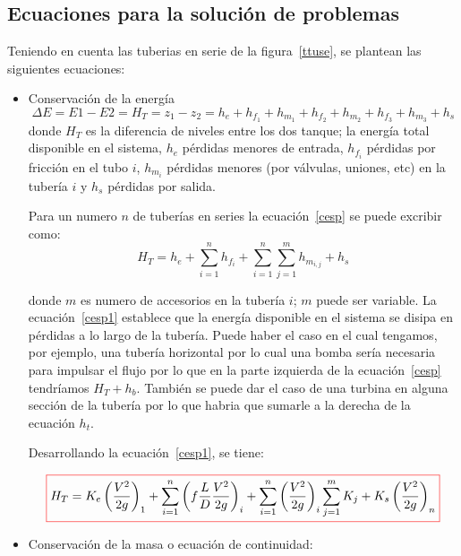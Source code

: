 \documentclass[10pt, oneside]{article}
\begin{document}
\subsection{Ecuaciones para la soluci\'on de problemas}
Teniendo en cuenta las tuberias en serie de la figura~\ref{ttuse}, se plantean las siguientes ecuaciones:
\begin{itemize}
\item Conservaci\'on de la energ\'ia
\begin{equation}
\Delta E = E1-E2 = H_T = z_1 - z_2 = h_e + h_{f_1} + h_{m_1} + h_{f_2} + h_{m_2} + h_{f_3} + h_{m_3} + h_s
\label{cesp}
\end{equation}
donde $H_T$ es la diferencia de niveles entre los dos tanque; la energ\'ia total disponible en el sistema, $h_e$ p\'erdidas menores de entrada, $h_{f_i}$ p\'erdidas por fricci\'on en el tubo $i$, $h_{m_i}$ p\'erdidas menores (por v\'alvulas, uniones, etc) en la tuber\'ia $i$ y $h_s$ p\'erdidas por salida.

Para un numero $n$ de tuber\'ias en series la ecuaci\'on~\ref{cesp} se puede excribir como:
\begin{equation}
H_T = h_e + \sum_{i=1}^{n} h_{f_i} + \sum_{i=1}^{n} \sum_{j=1}^{m} h_{m_{i,j}} + h_s 
\label{cesp1}
\end{equation}

donde $m$ es numero de accesorios en la tuber\'ia $i$; $m$ puede ser variable. La ecuaci\'on~\ref{cesp1} establece que la energ\'ia disponible en el sistema se disipa en p\'erdidas a lo largo de la tuber\'ia. Puede haber el caso en el cual tengamos, por ejemplo, una tuber\'ia horizontal por lo cual una bomba ser\'ia necesaria para impulsar el flujo por lo que en la parte izquierda de la ecuaci\'on~\ref{cesp} tendr\'iamos $H_T + h_b$. Tambi\'en se puede dar el caso de una turbina en alguna secci\'on de la tuber\'ia por lo que habria que sumarle a la derecha de la ecuaci\'on $h_t$.

Desarrollando la ecuaci\'on~\ref{cesp1}, se tiene:

\begin{equation}
\color{red}\boxed{\color{black} H_T = K_e \left( \frac{V^2}{2g} \right)_1 + \sum_{i=1}^{n} \left( f\frac{L}{D}\frac{V^2}{2g} \right)_i + \sum_{i=1}^{n} \left(\frac{V^2}{2g}\right)_i \sum_{j=1}^{m} K_j + K_s \left( \frac{V^2}{2g} \right)_n }
\label{cesp2}
\end{equation}

\item Conservaci\'on de la masa o ecuaci\'on de continuidad:


\end{itemize}
\end{document}
